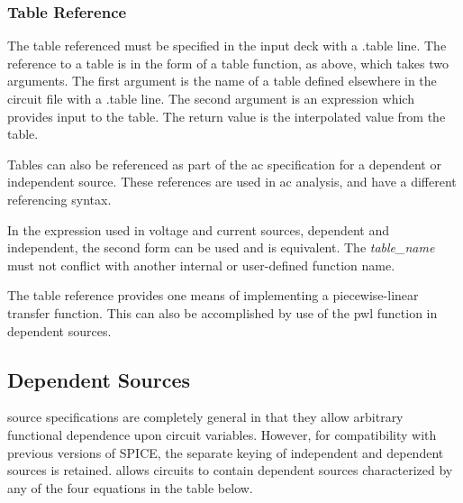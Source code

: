 \subsubsection{Table Reference}



The table referenced must be specified in the input deck with a {\vt
.table} line.  The reference to a table is in the form of a {\vt
table} function, as above, which takes two arguments.  The first
argument is the name of a table defined elsewhere in the circuit file
with a {\vt .table} line.  The second argument is an expression which
provides input to the table.  The return value is the interpolated
value from the table.

Tables can also be referenced as part of the ac specification for a
dependent or independent source.  These references are used in ac
analysis, and have a different referencing syntax.

In the expression used in voltage and current sources, dependent and
independent, the second form can be used and is equivalent.  The {\it
table\_name} must not conflict with another internal or user-defined
function name.

The {\vt table} reference provides one means of implementing a
piecewise-linear transfer function.  This can also be accomplished by
use of the {\vt pwl} function in dependent sources.

\subsection{Dependent Sources}
\label{depsrc}


{\WRspice} source specifications are completely general in that they
allow arbitrary functional dependence upon circuit variables.
However, for compatibility with previous versions of SPICE, the
separate keying of independent and dependent sources is retained.
{\WRspice} allows circuits to contain dependent sources characterized by
any of the four equations in the table below.

